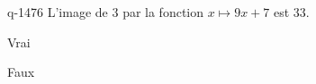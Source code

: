 \begin{truefalse}{q-1476}
L'image de $3$ par la fonction $x\mapsto 9x+7$ est $33$.
\item Vrai
\item* Faux
\end{truefalse}


